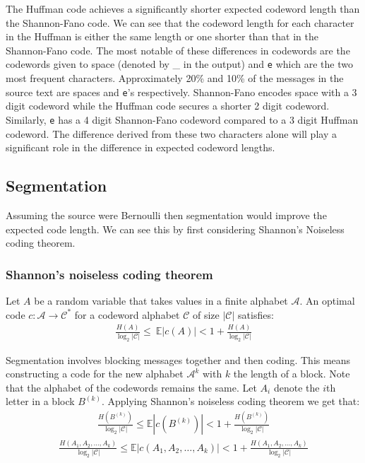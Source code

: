 \documentclass[a4paper]{article}
\begin{document}
\bigskip
The Huffman code achieves a significantly shorter expected codeword length than the Shannon-Fano code. We can see that the codeword length for each character in the Huffman is either the same length or one shorter than that in the Shannon-Fano code. The most notable of these differences in codewords are the codewords given to space (denoted by \_ in the output) and \texttt{e} which are the two most frequent characters. Approximately 20\% and 10\% of the messages in the source text are spaces and \texttt{e}'s respectively. Shannon-Fano encodes space with a 3 digit codeword while the Huffman code secures a shorter 2 digit codeword. Similarly, \texttt{e} has a 4 digit Shannon-Fano codeword compared to a 3 digit Huffman codeword. The difference derived from these two characters alone will play a significant role in the difference in expected codeword lengths.

\subsection*{Segmentation}

Assuming the source were Bernoulli then segmentation would improve the expected code length. We can see this by first considering Shannon's Noiseless coding theorem.


\subsubsection*{Shannon's noiseless coding theorem}
Let $A$ be a random variable that takes values in a finite alphabet $\mathcal{A}$. An optimal code $c: \mathcal{A} \rightarrow \mathcal{C}^*$ for a codeword alphabet $\mathcal{C}$ of size $|\mathcal{C}|$ satisfies:
\begin{align*}
    \frac{H(A)}{\log_2 |\mathcal{C}|} \leq\ \mathbb{E}|c(A)| < 1 + \frac{H(A)}{\log_2 |\mathcal{C}|}
\end{align*}

Segmentation involves blocking messages together and then coding. This means constructing a code for the new alphabet $\mathcal{A}^k$ with $k$ the length of a block. Note that the alphabet of the codewords remains the same. Let $A_i$ denote the $i$th letter in a block $B^{(k)}$. Applying Shannon's noiseless coding theorem we get that:
\begin{align*}
    \frac{H(B^{(k)})}{\log_2 |\mathcal{C}|} \leq \mathbb{E}|c(B^{(k)})| < 1 + \frac{H(B^{(k)})}{\log_2 |\mathcal{C}|}
\end{align*}
\begin{align*}
    \frac{H(A_1, A_2, \hdots, A_k)}{\log_2 |\mathcal{C}|} \leq \mathbb{E}|c(A_1, A_2, \hdots, A_k)| < 1 + \frac{H(A_1, A_2, \hdots, A_k)}{\log_2 |\mathcal{C}|}
\end{align*}
\end{document}

